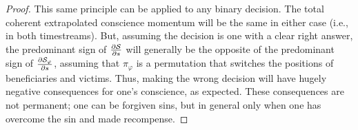 \documentclass{article}
\begin{document}
\begin{proof}
This same principle can be applied to any binary decision. The total
coherent extrapolated conscience momentum will be the same in either
case (i.e., in both timestreams). But, assuming the decision is one
with a clear right answer, the predominant sign of $\frac{\partial
  {\mathcal S}}{\partial s}$ will generally be the opposite of the predominant
sign of $\frac{\partial {\mathcal S}_\varphi}{\partial s}$, assuming that
$\pi_\varphi$ is a permutation that switches the positions of
beneficiaries and victims. Thus, making the wrong decision will have
hugely negative consequences for one's conscience, as expected. These
consequences are not permanent; one can be forgiven sins, but in
general only when one has overcome the sin and made recompense.
  
\end{proof}

 

\end{document}
